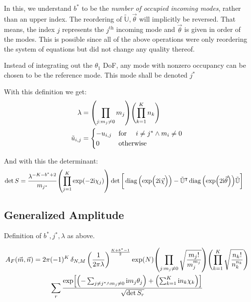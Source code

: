 \documentclass[
	english,
	a4paper,
	fontsize=10pt,
	parskip=half,
	titlepage=true,
	DIV=12,
	final
]{scrreprt}
\newcommand*{\transp}{\ensuremath{^\intercal}}
\newcommand*{\iunit}{\ensuremath{\mathrm{i}}}
\DeclareMathOperator{\diag}{diag}
\begin{document}
In this, we understand $b^*$ to be the \emph{number of occupied incoming modes}, rather than an upper index. The reordering of $\tilde{\mathbb{U}}, \vec{\theta}$ will implicitly be reversed. That means, the index $j$ represents the $j^{\text{th}}$ incoming mode and $\vec{\theta}$ is given in order of the modes. This is possible since all of the above operations were only reordering the system of equations but did not change any quality thereof.

Instead of integrating out the $\theta_1$ DoF, any mode with nonzero occupancy can be chosen to be the reference mode. This mode shall be denoted $j^*$

With this definition we get:
\begin{align}
	\lambda
&=
	\qty( \prod_{j : m_j \neq 0} m_j )
	\qty( \prod_{k=1}^{K}   n_k )
\label{eqn:DefLambdaNonBZO_m}
\\
	\tilde{u}_{i,j} 
&=
	\begin{cases}
		-u_{i,j}		&\qq*{for } i \neq j^* \land m_i \neq 0 \\
		0			&\qotherwise*
	\end{cases}
\label{eqn:DefReducedDFTNonBZO_m}
\end{align}

And with this the determinant:
\begin{align}
	\det S
&=
	\frac{ \lambda^{-K - b^* + 2} }{ m_{j^*} }
	\qty( \prod_{j=1}^{K} \exp(-2\iunit \chi_j) )
	\det\qty[\bigg.
		\diag\qty(\exp(\Big.2\iunit\vec{\chi}))
		-
		\tilde{\mathbb{U}}\transp
		\diag\qty(\exp(2\iunit\vec{\theta}))
		\tilde{\mathbb{U}}
	]
\label{eqn:detSNonBZO_m}
\end{align}

\subsection{Generalized Amplitude}
Definition of $b^*, j^*, \lambda$ as above.

\begin{multline}
	A_F(\vec{m}, \vec{n})
=
	2\pi (-1)^K \, \delta_{N,M} \, \qty(
		\frac{1}{2\pi\lambda}
	)^{\frac{K + b^* - 1}{2}}
	\exp(N)
	\qty( \prod_{j : m_j \neq 0}
		\sqrt{\frac
			{ m_j! }
			{ m_j^{m_j} }
	})
	\qty( \prod_{k=1}^{K}
		\sqrt{\frac
			{ n_k! }
			{ n_k^{n_k} }
	})
\\
	\sum_r
		\frac
		{\exp[
			\qty(- \sum_{j\neq j^* \land m_j \neq 0} \iunit m_j \theta_j) + 
			\qty(  \sum_{k=1}^{K}                    \iunit n_k \chi  _k)
		]}
		{\sqrt{\det S_r}}
\end{multline}
\end{document}
